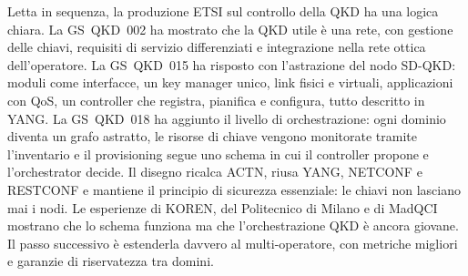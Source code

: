 Letta in sequenza, la produzione ETSI sul controllo della QKD ha una
logica chiara. La GS~QKD~002 ha mostrato che la QKD utile è una rete, con
gestione delle chiavi, requisiti di servizio differenziati e integrazione
nella rete ottica dell'operatore. La GS~QKD~015 ha risposto con
l'astrazione del nodo SD-QKD: moduli come interfacce, un key manager unico,
link fisici e virtuali, applicazioni con QoS, un controller che registra,
pianifica e configura, tutto descritto in YANG. La GS~QKD~018 ha aggiunto
il livello di orchestrazione: ogni dominio diventa un grafo astratto, le
risorse di chiave vengono monitorate tramite l'inventario e il provisioning
segue uno schema in cui il controller propone e l'orchestrator decide. Il
disegno ricalca ACTN, riusa YANG, NETCONF e RESTCONF e mantiene il principio
di sicurezza essenziale: le chiavi non lasciano mai i nodi. Le esperienze di
KOREN, del Politecnico di Milano e di MadQCI mostrano che lo schema funziona
ma che l'orchestrazione QKD è ancora giovane. Il passo successivo è
estenderla davvero al multi-operatore, con metriche migliori e garanzie di
riservatezza tra domini.

